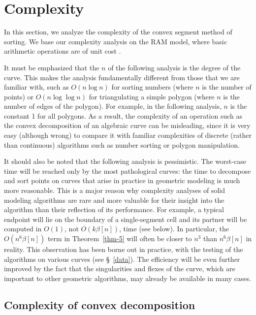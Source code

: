 \section{Complexity}
\label{s-c}

In this section, we analyze the complexity of the convex segment method of sorting.
We base our complexity analysis on the RAM model, where basic arithmetic operations
are of unit cost \cite{ahu}.

It must be emphasized that the $n$ of the following analysis is the degree of the curve.
This makes the analysis fundamentally different from those that we
are familiar with, such as $O(n \log n)$ for sorting numbers (where
$n$ is the number of points) or $O(n \log \log n)$ for triangulating a simple
polygon (where $n$ is the number of edges of the polygon).
For example, in the following analysis, $n$ is the constant 1 for all polygons.
As a result, the complexity of an operation such as the convex decomposition of an
algebraic curve can be misleading, since it is very easy (although wrong) to 
compare it with familiar complexities of discrete (rather than continuous) algorithms 
such as number sorting or polygon manipulation.

It should also be noted that the following analysis is pessimistic.
The worst-case time will be reached only by the most pathological curves: the time to 
decompose and sort points on curves that arise in practice 
in geometric modeling is much more reasonable.
This is a major reason why complexity analyses of solid modeling algorithms are rare
and more valuable for their insight into the algorithm than their reflection of its
performance.
For example, a typical endpoint will lie on the boundary of a single-segment cell and its 
partner will be computed in $O(1)$, not $O(k \beta[n])$, time (see below).
In particular, the $O(n^{6}\beta[n])$ term in Theorem~\ref{thm-5} will often be
closer to $n^{3}$ than $n^{6}\beta[n]$ in reality.
This observation has been borne out in practice, with the testing of the algorithms on
various curves (see \S~\ref{data}).
The efficiency will be even further improved by the fact that the singularities and 
flexes of the curve, which are important to other geometric algorithms, may already 
be available in many cases.

\clearpage

\subsection{Complexity of convex decomposition}

